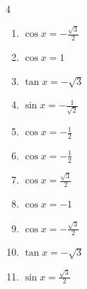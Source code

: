 \begin{multicols}{4}
\begin{enumerate}
  \item $\displaystyle \cos{x}  = -\frac{\sqrt{3}}{2}$


  \item $\displaystyle \cos{x}  = 1$

        \phantom{$\displaystyle x = 0$}

  \item $\displaystyle \tan{x}  = -\sqrt{3}$


  \item $\displaystyle \sin{x}  = -\frac{1}{\sqrt{2}}$


  \item $\displaystyle \cos{x}  = -\frac{1}{2}$


  \item $\displaystyle \cos{x}  = -\frac{1}{2}$


  \item $\displaystyle \cos{x}  = \frac{\sqrt{3}}{2}$


  \item $\displaystyle \cos{x}  = -1$

        \phantom{$\displaystyle x = \pi$}

  \item $\displaystyle \cos{x}  = -\frac{\sqrt{3}}{2}$


  \item $\displaystyle \tan{x}  = -\sqrt{3}$


\columnbreak %

\resetques

  \item $\displaystyle \sin{x}  = \frac{\sqrt{3}}{2}$



\end{enumerate}
\end{multicols}
